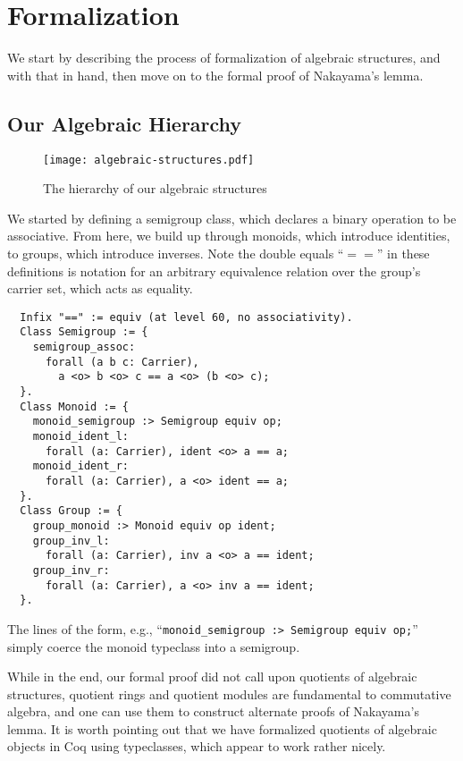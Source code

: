 \documentclass{article}
\begin{document}
\section{Formalization}

We start by describing the process of formalization of algebraic structures, and with that in hand, then move on to the formal proof of Nakayama's lemma.  

\subsection{Our Algebraic Hierarchy}

\begin{figure}[t]
\caption{The hierarchy of our algebraic structures}
\texttt{[image: algebraic-structures.pdf]}
\centering
{}
\end{figure}

We started by defining a semigroup class, which declares a binary operation to
be associative. From here, we build up through monoids, which introduce
identities, to groups, which introduce inverses. Note the double equals ``$==$'' in
these definitions is notation for an arbitrary equivalence relation over the
group's carrier set, which acts as equality.

\begin{verbatim}
  Infix "==" := equiv (at level 60, no associativity).
  Class Semigroup := {
    semigroup_assoc:
      forall (a b c: Carrier),
        a <o> b <o> c == a <o> (b <o> c);
  }.
  Class Monoid := {
    monoid_semigroup :> Semigroup equiv op;
    monoid_ident_l:
      forall (a: Carrier), ident <o> a == a;
    monoid_ident_r:
      forall (a: Carrier), a <o> ident == a;
  }.
  Class Group := {
    group_monoid :> Monoid equiv op ident;
    group_inv_l:
      forall (a: Carrier), inv a <o> a == ident;
    group_inv_r:
      forall (a: Carrier), a <o> inv a == ident;
  }.
\end{verbatim}
The lines of the form, e.g.,  ``\verb|monoid_semigroup :> Semigroup equiv op;|'' simply coerce
the monoid typeclass into a semigroup.

While in the end, our formal proof did not call upon quotients of algebraic structures, quotient rings and quotient modules are fundamental to commutative algebra, and one can use them to construct alternate proofs of Nakayama's lemma.
It is worth pointing out that we have formalized quotients of algebraic objects  in Coq using typeclasses, which appear to work rather nicely. 
\end{document}

